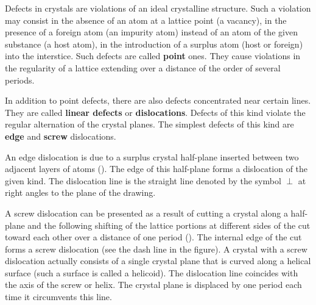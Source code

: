 Defects in crystals are violations of an ideal crystalline structure. Such a violation may consist in the absence of an atom at a lattice point (a vacancy), in the presence of a foreign atom (an impurity atom) instead of an atom of the given substance (a host atom), in the introduction of a surplus atom (host or foreign) into the interstice. Such defects are called \textbf{point} ones. They cause violations in the regularity of a lattice extending over a distance of the order of several periods.

In addition to point defects, there are also defects concentrated near certain lines. They are called \textbf{linear defects} or \textbf{dislocations}. Defects of this kind violate the regular alternation of the crystal planes. The simplest defects of this kind are \textbf{edge} and \textbf{screw} dislocations.

An edge dislocation is due to a surplus crystal half-plane inserted between two adjacent layers of atoms (). The edge of this half-plane forms a dislocation of the given kind. The dislocation line is the straight line denoted by the symbol $\perp$ at right angles to the plane of the drawing.

A screw dislocation can be presented as a result of cutting a crystal along a half-plane and the following shifting of the lattice portions at different sides of the cut toward each other over a distance of one period (). The internal edge of the cut forms a screw dislocation (see the dash line in the figure). A crystal with a screw dislocation actually consists of a single crystal plane that is curved along a helical surface (such a surface is called a helicoid). The dislocation line coincides with the axis of the screw or helix. The crystal plane is displaced by one period each time it circumvents this line.

